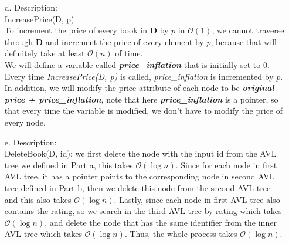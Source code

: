 \documentclass[10pt]{article}
\begin{document}
\begin{enumerate}
\item[d.] Description:\\
IncreasePrice(D, p)\\
To increment the price of every book in \textbf{D} by $p$ in $\mathcal{O}(1)$, we cannot traverse through \textbf{D} and increment the price of every element by $p$, because that will definitely take at least $\mathcal{O}(n)$ of time.\\
We will define a variable called \textbf{\textit{price\_inflation}} that is initially set to 0.\\
Every time \textit{IncreasePrice(D, p)} is called, \textit{price\_inflation} is incremented by $p$.\\
In addition, we will modify the price attribute of each node to be \textbf{\textit{original price + price\_inflation}},
note that here \textbf{\textit{price\_inflation}} is a pointer, so that every time the variable is modified, we don't have to modify the price of every node.

\item[e.]Description:\\
DeleteBook(D, id): we first delete the node with the input id from the AVL tree we defined in Part a, this takes $\mathcal{O}(\log n)$. Since for each node in first AVL tree, it has a pointer points to the corresponding node in second AVL tree defined in Part b, then we delete this node from the second AVL tree and this also takes $\mathcal{O}(\log n)$. Lastly, since each node in first AVL tree also contains the rating, so we search in the third AVL tree by rating which takes $\mathcal{O}(\log n)$, and delete the node that has the same identifier from the inner AVL tree which takes $\mathcal{O}(\log n)$. Thus, the whole process takes $\mathcal{O}(\log n)$.


\end{enumerate}
\end{document}
